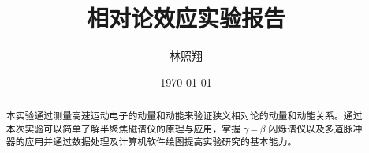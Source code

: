 \documentclass[aps,prl,preprint,groupedaddress]{revtex4-2}
\begin{document}
\renewcommand{\thesection}{\Roman{section}}

\title{相对论效应实验报告}


\author{林照翔}


\date{\today}

\begin{abstract}
本实验通过测量高速运动电子的动量和动能来验证狭义相对论的动量和动能关系。通过本次实验可以简单了解半聚焦磁谱仪的原理与应用，掌握 $\gamma-\beta $ 闪烁谱仪以及多道脉冲器的应用并通过数据处理及计算机软件绘图提高实验研究的基本能力。

\end{abstract}


\maketitle
\end{document}
